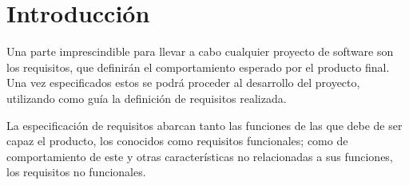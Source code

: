 
\section{Introducción}

Una parte imprescindible para llevar a cabo cualquier proyecto de software son los requisitos, que definirán el comportamiento esperado por el producto final. Una vez especificados estos se podrá proceder al desarrollo del proyecto, utilizando como guía la definición de requisitos realizada.

La especificación de requisitos abarcan tanto las funciones de las que debe de ser capaz el producto, los conocidos como requisitos funcionales; como de comportamiento de este y otras características no relacionadas a sus funciones, los requisitos no funcionales.
%

